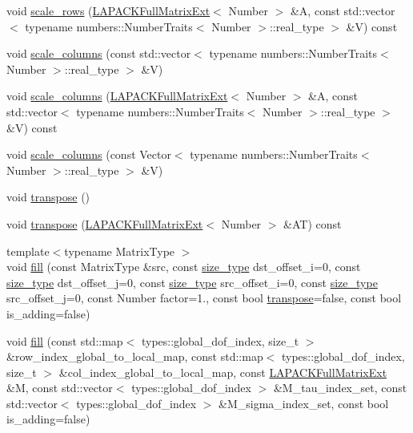 \begin{DoxyCompactItemize}
\item 
void \hyperlink{classLAPACKFullMatrixExt_a88b31beb3170825867a0b15b59770d61}{scale\+\_\+rows} (\hyperlink{classLAPACKFullMatrixExt}{L\+A\+P\+A\+C\+K\+Full\+Matrix\+Ext}$<$ Number $>$ \&A, const std\+::vector$<$ typename numbers\+::\+Number\+Traits$<$ Number $>$\+::real\+\_\+type $>$ \&V) const
\item 
void \hyperlink{classLAPACKFullMatrixExt_a75b2bb9434eb015f756747b943669fd7}{scale\+\_\+columns} (const std\+::vector$<$ typename numbers\+::\+Number\+Traits$<$ Number $>$\+::real\+\_\+type $>$ \&V)
\item 
void \hyperlink{classLAPACKFullMatrixExt_a2510d3bd30956bb2831b960796d3abca}{scale\+\_\+columns} (\hyperlink{classLAPACKFullMatrixExt}{L\+A\+P\+A\+C\+K\+Full\+Matrix\+Ext}$<$ Number $>$ \&A, const std\+::vector$<$ typename numbers\+::\+Number\+Traits$<$ Number $>$\+::real\+\_\+type $>$ \&V) const
\item 
void \hyperlink{classLAPACKFullMatrixExt_ab6e19be9ab53b4a38ba0d47a3b5f3daa}{scale\+\_\+columns} (const Vector$<$ typename numbers\+::\+Number\+Traits$<$ Number $>$\+::real\+\_\+type $>$ \&V)
\item 
void \hyperlink{classLAPACKFullMatrixExt_ac46d71bc1b0288fce7ad44b222e9210b}{transpose} ()
\item 
void \hyperlink{classLAPACKFullMatrixExt_a12a95aeff6e93f0284c59cffd0fb7b8e}{transpose} (\hyperlink{classLAPACKFullMatrixExt}{L\+A\+P\+A\+C\+K\+Full\+Matrix\+Ext}$<$ Number $>$ \&AT) const
\item 
{\footnotesize template$<$typename Matrix\+Type $>$ }\\void \hyperlink{classLAPACKFullMatrixExt_ada3ff3d40049aca2c4d554baa701d613}{fill} (const Matrix\+Type \&src, const \hyperlink{classLAPACKFullMatrixExt_a5cf5f4a6104dc17029210b5ca52bf574}{size\+\_\+type} dst\+\_\+offset\+\_\+i=0, const \hyperlink{classLAPACKFullMatrixExt_a5cf5f4a6104dc17029210b5ca52bf574}{size\+\_\+type} dst\+\_\+offset\+\_\+j=0, const \hyperlink{classLAPACKFullMatrixExt_a5cf5f4a6104dc17029210b5ca52bf574}{size\+\_\+type} src\+\_\+offset\+\_\+i=0, const \hyperlink{classLAPACKFullMatrixExt_a5cf5f4a6104dc17029210b5ca52bf574}{size\+\_\+type} src\+\_\+offset\+\_\+j=0, const Number factor=1., const bool \hyperlink{classLAPACKFullMatrixExt_ac46d71bc1b0288fce7ad44b222e9210b}{transpose}=false, const bool is\+\_\+adding=false)
\item 
void \hyperlink{classLAPACKFullMatrixExt_a3f0dffff13babd0b952a821b5f1f23c9}{fill} (const std\+::map$<$ types\+::global\+\_\+dof\+\_\+index, size\+\_\+t $>$ \&row\+\_\+index\+\_\+global\+\_\+to\+\_\+local\+\_\+map, const std\+::map$<$ types\+::global\+\_\+dof\+\_\+index, size\+\_\+t $>$ \&col\+\_\+index\+\_\+global\+\_\+to\+\_\+local\+\_\+map, const \hyperlink{classLAPACKFullMatrixExt}{L\+A\+P\+A\+C\+K\+Full\+Matrix\+Ext} \&M, const std\+::vector$<$ types\+::global\+\_\+dof\+\_\+index $>$ \&M\+\_\+tau\+\_\+index\+\_\+set, const std\+::vector$<$ types\+::global\+\_\+dof\+\_\+index $>$ \&M\+\_\+sigma\+\_\+index\+\_\+set, const bool is\+\_\+adding=false)

\end{DoxyCompactItemize}
